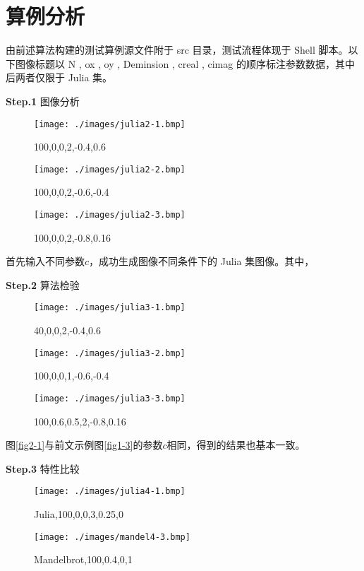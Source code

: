 \section{算例分析}

由前述算法构建的测试算例源文件附于 src 目录，测试流程体现于 Shell 脚本。以下图像标题以 N , ox , oy , Deminsion , creal , cimag 的顺序标注参数数据，其中后两者仅限于 Julia 集。

\textbf{Step.1} 图像分析

\begin{figure}[htbp]
\centering
\begin{minipage}{0.33\linewidth}
\centering
\texttt{[image: ./images/julia2-1.bmp]}
\caption{100,0,0,2,-0.4,0.6}
\label{fig2-1}
\end{minipage}\hfill
\begin{minipage}{0.33\linewidth}
\centering
\texttt{[image: ./images/julia2-2.bmp]}
\caption{100,0,0,2,-0.6,-0.4}
\label{fig2-2}
\end{minipage}\hfill
\begin{minipage}{0.33\linewidth}
\centering
\texttt{[image: ./images/julia2-3.bmp]}
\caption{100,0,0,2,-0.8,0.16}
\label{fig2-3}
\end{minipage}
\end{figure}

首先输入不同参数$c$，成功生成图像不同条件下的 Julia 集图像。其中，


\textbf{Step.2} 算法检验

\begin{figure}[htbp]
\centering
\begin{minipage}{0.33\linewidth}
\centering
\texttt{[image: ./images/julia3-1.bmp]}
\caption{40,0,0,2,-0.4,0.6}
\label{fig3-1}
\end{minipage}\hfill
\begin{minipage}{0.33\linewidth}
\centering
\texttt{[image: ./images/julia3-2.bmp]}
\caption{100,0,0,1,-0.6,-0.4}
\label{fig3-2}
\end{minipage}\hfill
\begin{minipage}{0.33\linewidth}
\centering
\texttt{[image: ./images/julia3-3.bmp]}
\caption{100,0.6,0.5,2,-0.8,0.16}
\label{fig3-3}
\end{minipage}
\end{figure}

图\ref{fig2-1}与前文示例图\ref{fig1-3}的参数$c$相同，得到的结果也基本一致。

\textbf{Step.3} 特性比较

\begin{figure}[htb]
\centering
\begin{minipage}{0.45\linewidth}
\centering
\texttt{[image: ./images/julia4-1.bmp]}
\caption{Julia,100,0,0,3,0.25,0}
\label{fig4-1}
\end{minipage}\hfill
\begin{minipage}{0.45\linewidth}
\centering
\texttt{[image: ./images/mandel4-3.bmp]}
\caption{Mandelbrot,100,0.4,0,1}
\label{fig4-2}
\end{minipage}
\end{figure}
